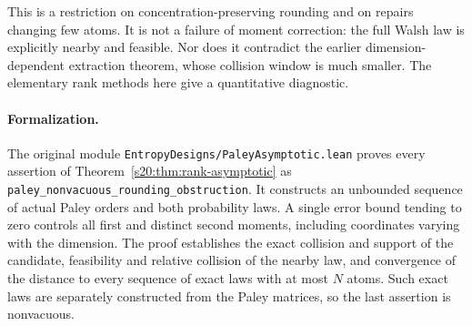 This is a restriction on concentration-preserving rounding and on
repairs changing few atoms. It is not a failure of moment correction:
the full Walsh law is explicitly nearby and feasible. Nor does it
contradict the earlier dimension-dependent extraction theorem, whose
collision window is much smaller. The elementary rank methods here give a quantitative diagnostic.


\paragraph{Formalization.}
The original module
\texttt{EntropyDesigns/\allowbreak PaleyAsymptotic.lean}
proves every assertion of Theorem~\ref{s20:thm:rank-asymptotic} as
\texttt{paley\_\allowbreak nonvacuous\_\allowbreak rounding\_\allowbreak obstruction}.
It constructs an unbounded sequence of actual Paley orders and both
probability laws. A single error bound tending to zero controls all
first and distinct second moments, including coordinates varying with
the dimension. The proof establishes the exact collision and support
of the candidate, feasibility and relative collision of the nearby
law, and convergence of the distance to every sequence of exact laws
with at most $N$ atoms. Such exact laws are separately constructed
from the Paley matrices, so the last assertion is nonvacuous.
